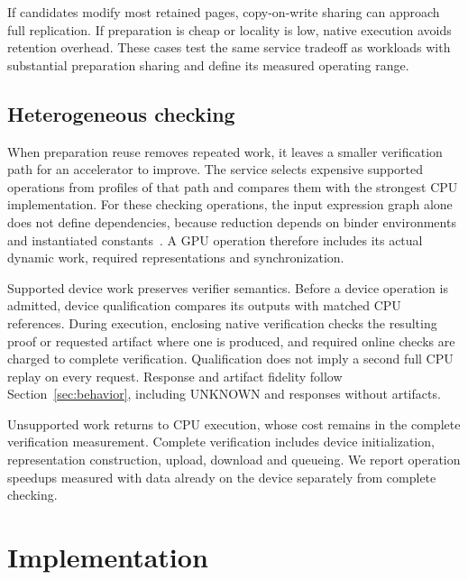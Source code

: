 \documentclass[10pt,twocolumn]{article}
\begin{document}
If candidates modify most retained pages, copy-on-write sharing can approach full replication. If preparation is cheap or locality is low, native execution avoids retention overhead. These cases test the same service tradeoff as workloads with substantial preparation sharing and define its measured operating range.

\subsection{Heterogeneous checking}\label{sec:device}
When preparation reuse removes repeated work, it leaves a smaller verification path for an accelerator to improve. The service selects expensive supported operations from profiles of that path and compares them with the strongest CPU implementation. For these checking operations, the input expression graph alone does not define dependencies, because reduction depends on binder environments and instantiated constants~\cite{lean4,nanoclo}. A GPU operation therefore includes its actual dynamic work, required representations and synchronization.

Supported device work preserves verifier semantics. Before a device operation is admitted, device qualification compares its outputs with matched CPU references. During execution, enclosing native verification checks the resulting proof or requested artifact where one is produced, and required online checks are charged to complete verification. Qualification does not imply a second full CPU replay on every request. Response and artifact fidelity follow Section~\ref{sec:behavior}, including UNKNOWN and responses without artifacts.

Unsupported work returns to CPU execution, whose cost remains in the complete verification measurement. Complete verification includes device initialization, representation construction, upload, download and queueing. We report operation speedups measured with data already on the device separately from complete checking.

\section{Implementation}
\end{document}
